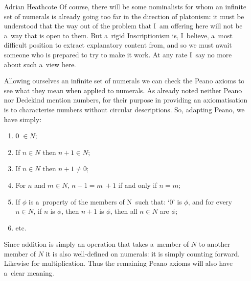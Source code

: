 \begin{artengenv}{Adrian Heathcote}
Of course, there will be some nominalists for whom an infinite set of numerals is already going too far in the direction of platonism: it must be understood that the way out of the problem that I~am offering here will not be a~way that is open to them. But a~rigid Inscriptionism is, I~believe, a~most difficult position to extract explanatory content from, and so we must await someone who is prepared to try to make it work. At any rate I~say no more about such a~view here.

Allowing ourselves an infinite set of numerals we can check the Peano axioms to see what they mean when applied to numerals. As already noted neither Peano nor Dedekind mention numbers, for their purpose in providing an axiomatisation is to characterise numbers without circular descriptions. So, adapting Peano, we have simply:

\begin{enumerate}[label=P*\Roman* :]

  \item 0 $\in N$;
  
  \item If $n \in N$ then $n + 1 \in N$;
  
  \item If $n \in N$ then $n + 1 \neq 0$;
  
  \item For $n$ and $m \in N$, $n + 1 = m~+ 1$ if and only if $n = m$;
  
  \item If $\phi$ is a~property of the members of N~such that: `0' is $\phi$, and for every $n \in N$, if $n$ is $\phi$, then $n + 1$ is $\phi$, then all $n \in N$ are $\phi$;
  
  \item etc.
  \end{enumerate}
Since addition is simply an operation that takes a~member of $N$ to another member of $N$ it is also well-defined on numerals: it is simply counting forward. Likewise for multiplication. Thus the remaining Peano axioms will also have a~clear meaning.


\end{artengenv}
